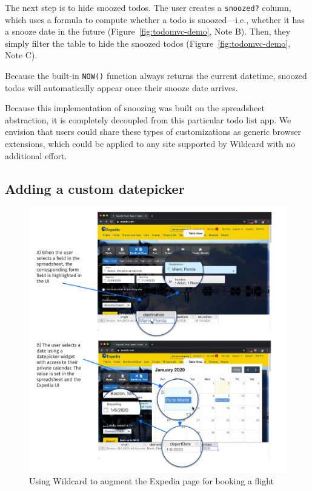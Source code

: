 \documentclass[sigplan,10pt,anonymous,review]{acmart}
\begin{document}
The next step is to hide snoozed todos. The user creates a
\texttt{snoozed?} column, which uses a formula to compute whether a todo
is snoozed---i.e., whether it has a snooze date in the future{
(Figure~\ref{fig:todomvc-demo}, Note B)}. Then, they simply filter the
table to hide the snoozed todos{ (Figure~\ref{fig:todomvc-demo}, Note
C)}.

Because the built-in \texttt{NOW()} function always returns the current
datetime, snoozed todos will automatically appear once their snooze date
arrives.

Because this implementation of snoozing was built on the spreadsheet
abstraction, it is completely decoupled from this particular todo list
app. We envision that users could share these types of customizations as
generic browser extensions, which could be applied to any site supported
by Wildcard with no additional effort.

\hypertarget{adding-a-custom-datepicker}{%
\subsection{Adding a custom
datepicker}\label{adding-a-custom-datepicker}}

\begin{figure}
\hypertarget{fig:airbnb-demo}{%
\centering
\includegraphics{media/expedia-demo-300dpi.png}
\caption{Using Wildcard to augment the Expedia page for booking a flight}\label{fig:expedia-demo}
}
\end{figure}
\end{document}

